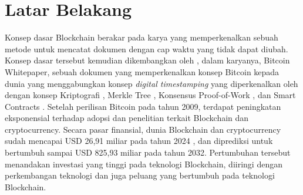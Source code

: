 \section{Latar Belakang}
\label{sec:latarbelakang}

Konsep dasar Blockchain berakar pada karya \cite{haber1991time} yang memperkenalkan sebuah metode untuk mencatat dokumen dengan cap waktu yang tidak dapat diubah. Konsep dasar tersebut kemudian dikembangkan oleh \cite{nakamoto2008bitcoin}, dalam karyanya, Bitcoin Whitepaper, sebuah dokumen yang memperkenalkan konsep Bitcoin kepada dunia yang menggabungkan konsep \textit{digital timestamping} yang diperkenalkan oleh \cite{haber1991time} dengan konsep Kriptografi \parencite{hellman1976new} \parencite{standard1995secure}, Merkle Tree \parencite{merkle1987digital}, Konsensus Proof-of-Work \parencite{dwork1992pricing}, dan Smart Contracts \parencite{szabo1997formalizing}. Setelah perilisan Bitcoin pada tahun 2009, terdapat peningkatan eksponensial terhadap adopsi dan penelitian terkait Blockchain dan cryptocurrency. Secara pasar finansial, dunia Blockchain dan cryptocurrency sudah mencapai USD 26,91 miliar pada tahun 2024 \parencite{rosencrance2024top}, dan diprediksi untuk bertumbuh sampai USD 825,93 miliar pada tahun 2032. Pertumbuhan tersebut menandakan investasi yang tinggi pada teknologi Blockchain, diiringi dengan perkembangan teknologi dan juga peluang yang bertumbuh pada teknologi Blockchain. 


